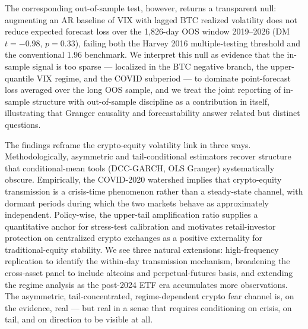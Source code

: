 \documentclass[11pt,a4paper]{article}
\begin{document}
The corresponding out-of-sample test, however, returns a transparent null: augmenting an AR baseline of VIX with lagged BTC realized volatility does not reduce expected forecast loss over the 1{,}826-day OOS window 2019--2026 (DM $t = -0.98$, $p = 0.33$), failing both the Harvey 2016 multiple-testing threshold and the conventional 1.96 benchmark. We interpret this null as evidence that the in-sample signal is too sparse --- localized in the BTC negative branch, the upper-quantile VIX regime, and the COVID subperiod --- to dominate point-forecast loss averaged over the long OOS sample, and we treat the joint reporting of in-sample structure with out-of-sample discipline as a contribution in itself, illustrating that Granger causality and forecastability answer related but distinct questions.

The findings reframe the crypto-equity volatility link in three ways. Methodologically, asymmetric and tail-conditional estimators recover structure that conditional-mean tools (DCC-GARCH, OLS Granger) systematically obscure. Empirically, the COVID-2020 watershed implies that crypto-equity transmission is a crisis-time phenomenon rather than a steady-state channel, with dormant periods during which the two markets behave as approximately independent. Policy-wise, the upper-tail amplification ratio supplies a quantitative anchor for stress-test calibration and motivates retail-investor protection on centralized crypto exchanges as a positive externality for traditional-equity stability. We see three natural extensions: high-frequency replication to identify the within-day transmission mechanism, broadening the cross-asset panel to include altcoins and perpetual-futures basis, and extending the regime analysis as the post-2024 ETF era accumulates more observations. The asymmetric, tail-concentrated, regime-dependent crypto fear channel is, on the evidence, real --- but real in a sense that requires conditioning on crisis, on tail, and on direction to be visible at all.
\end{document}
